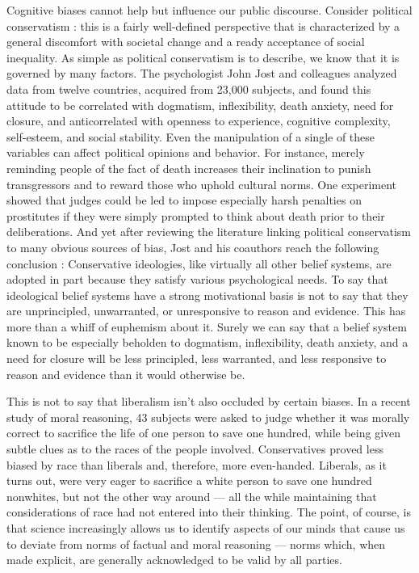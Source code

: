 \documentclass[a4paper,14pt]{extarticle}
\begin{document}
Cognitive biases cannot help but influence our public discourse.
Consider political conservatism :
this is a fairly well-defined perspective that is characterized by a general discomfort with societal change and a ready acceptance of social inequality.
As simple as political conservatism is to describe, we know that it is governed by many factors.
The psychologist John Jost and colleagues analyzed data from twelve countries, acquired from 23,000 subjects, and found this attitude to be correlated with dogmatism, inflexibility, death anxiety, need for closure, and anticorrelated with openness to experience, cognitive complexity, self-esteem, and social stability.
Even the manipulation of a single of these variables can affect political opinions and behavior.
For instance, merely reminding people of the fact of death increases their inclination to punish transgressors and to reward those who uphold cultural norms.
One experiment showed that judges could be led to impose especially harsh penalties on prostitutes if they were simply prompted to think about death prior to their deliberations.
And yet after reviewing the literature linking political conservatism to many obvious sources of bias, Jost and his coauthors reach the following conclusion :
Conservative ideologies, like virtually all other belief systems, are adopted in part because they satisfy various psychological needs.
To say that ideological belief systems have a strong motivational basis is not to say that they are unprincipled, unwarranted, or unresponsive to reason and evidence.
This has more than a whiff of euphemism about it.
Surely we can say that a belief system known to be especially beholden to dogmatism, inflexibility, death anxiety, and a need for closure will be less principled, less warranted, and less responsive to reason and evidence than it would otherwise be.

This is not to say that liberalism isn’t also occluded by certain biases.
In a recent study of moral reasoning, 43 subjects were asked to judge whether it was morally correct to sacrifice the life of one person to save one hundred, while being given subtle clues as to the races of the people involved.
Conservatives proved less biased by race than liberals and, therefore, more even-handed.
Liberals, as it turns out, were very eager to sacrifice a white person to save one hundred nonwhites, but not the other way around --- all the while maintaining that considerations of race had not entered into their thinking.
The point, of course, is that science increasingly allows us to identify aspects of our minds that cause us to deviate from norms of factual and moral reasoning --- norms which, when made explicit, are generally acknowledged to be valid by all parties.
\end{document}
